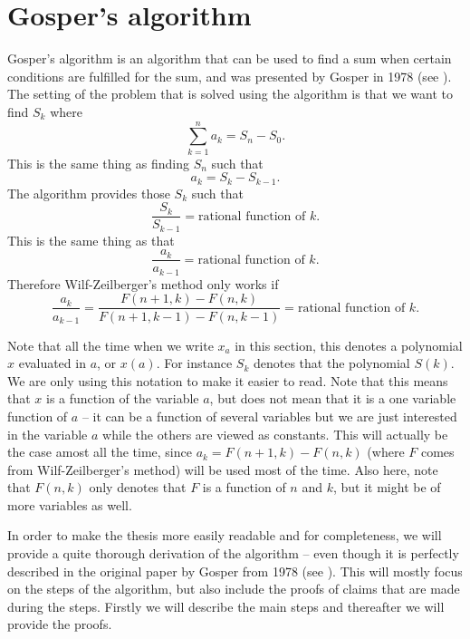 \section{Gosper's algorithm}\label{Sec: Gosper}
Gosper's algorithm is an algorithm that can be used to find a sum when certain conditions are fulfilled for the sum, and was presented by Gosper in 1978 (see ). The setting of the problem that is solved using the algorithm is that we want to find $S_k$ where
\begin{equation}\label{Eq: Theory,Gosper1}
  \sum_{k=1}^n a_k = S_n-S_0.
\end{equation}
This is the same thing as finding $S_n$ such that
\begin{equation}\label{Eq: Theory,Gosper2}
  a_k = S_k - S_{k-1}.
\end{equation}
The algorithm provides those $S_k$ such that
\begin{equation}
  \frac{S_k}{S_{k-1}} = \text{rational function of } k.
\end{equation}
This is the same thing as that
\begin{equation}
  \frac{a_k}{a_{k-1}} = \text{rational function of } k.
\end{equation}
Therefore Wilf-Zeilberger's method only works if
\begin{equation}
  \frac{a_k}{a_{k-1}} = \frac{F(n+1,k)-F(n,k)}{F(n+1,k-1)-F(n,k-1)} = \text{rational function of } k.
\end{equation}

Note that all the time when we write $x_a$ in this section, this denotes a polynomial $x$ evaluated in $a$, or $x(a)$. For instance $S_k$ denotes that the polynomial $S(k)$. We are only using this notation to make it easier to read. Note that this means that $x$ is a function of the variable $a$, but does not mean that it is a one variable function of $a$ -- it can be a function of several variables but we are just interested in the variable $a$ while the others are viewed as constants. This will actually be the case amost all the time, since $a_k=F(n+1,k)-F(n,k)$ (where $F$ comes from Wilf-Zeilberger's method) will be used most of the time. Also here, note that $F(n,k)$ only denotes that $F$ is a function of $n$ and $k$, but it might be of more variables as well.

In order to make the thesis more easily readable and for completeness, we will provide a quite thorough derivation of the algorithm -- even though it is perfectly described in the original paper by Gosper from 1978 (see ). This will mostly focus on the steps of the algorithm, but also include the proofs of claims that are made during the steps. Firstly we will describe the main steps and thereafter we will provide the proofs.

